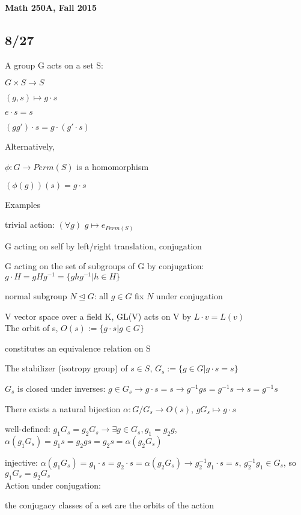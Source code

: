 \documentclass[12pt]{article}
\begin{document}
\noindent
\textbf{Math 250A, Fall 2015}

\subsection{8/27}

\noindent
A group G acts on a set S:

$G \times S \to S$

$(g, s) \mapsto g \cdot s$

$e \cdot s = s$

$(g g') \cdot s = g \cdot (g' \cdot s)$

\noindent
Alternatively,

$\phi: G \to Perm(S)$ is a homomorphism

$(\phi(g))(s) = g \cdot s$

\noindent
Examples

trivial action: $(\forall g)$ $g \mapsto e_{Perm(S)}$

G acting on self by left/right translation, conjugation

G acting on the set of subgroups of G by conjugation: $g \cdot H = gHg^{-1} = \{ghg^{-1} | h \in H\}$

normal subgroup $N \trianglelefteq G$: all $g \in G$ fix $N$ under conjugation

V vector space over a field K, GL(V) acts on V by $L \cdot v = L(v)$\\

\noindent
The orbit of s, $O(s) := \{g \cdot s | g \in G\}$

constitutes an equivalence relation on S

\noindent
The stabilizer (isotropy group) of $s \in S$, $G_s := \{g \in G |g \cdot s = s\}$

$G_s$ is closed under inverses: $g \in G_s \to g \cdot s = s \to g^{-1}gs = g^{-1}s \to s = g^{-1}s$

\noindent
There exists a natural bijection $\alpha: G/G_s \to O(s)$, $gG_s \mapsto g \cdot s$

well-defined: $g_1G_s = g_2G_s \to \exists g \in G_s, g_1 = g_2g$, $\alpha(g_1G_s) = g_1s = g_2 g s = g_2 s = \alpha(g_2G_s)$

injective: $\alpha(g_1G_s) = g_1 \cdot s = g_2 \cdot s = \alpha(g_2G_s) \to g_2^{-1}g_1 \cdot s = s$, $g_2^{-1}g_1 \in G_s$, so $g_1G_s = g_2G_s$\\

\noindent
Action under conjugation:

the conjugacy classes of a set are the orbits of the action
\end{document}
